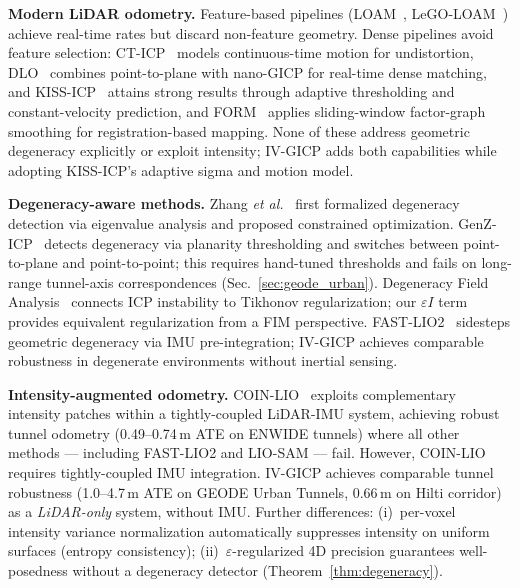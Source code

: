 \documentclass[journal,letterpaper,10pt]{IEEEtran}
\newcommand{\etal}{\textit{et al.}}
\begin{document}
\textbf{Modern LiDAR odometry.}
Feature-based pipelines (LOAM~\cite{zhang2014loam},
LeGO-LOAM~\cite{shan2018lego}) achieve real-time rates but discard
non-feature geometry.
Dense pipelines avoid feature selection:
CT-ICP~\cite{dellenbach2022ct} models continuous-time motion for
undistortion,
DLO~\cite{chen2022dlo} combines point-to-plane with nano-GICP for
real-time dense matching, and
KISS-ICP~\cite{vizzo2023kiss} attains strong results through adaptive
thresholding and constant-velocity prediction,
and FORM~\cite{potokar2025form} applies sliding-window factor-graph
smoothing for registration-based mapping.
None of these address geometric degeneracy explicitly or exploit
intensity; IV-GICP adds both capabilities while
adopting KISS-ICP's adaptive sigma and motion model.

\textbf{Degeneracy-aware methods.}
Zhang \etal~\cite{zhang2016degeneracy} first formalized degeneracy
detection via eigenvalue analysis and proposed constrained optimization.
GenZ-ICP~\cite{zhang2024genz} detects degeneracy via planarity
thresholding and switches between point-to-plane and point-to-point;
this requires hand-tuned thresholds and fails on long-range
tunnel-axis correspondences (Sec.~\ref{sec:geode_urban}).
Degeneracy Field Analysis~\cite{vizzo2024degeneracy} connects ICP
instability to Tikhonov regularization; our $\varepsilon I$ term provides
equivalent regularization from a FIM perspective.
FAST-LIO2~\cite{xu2022fastlio2} sidesteps geometric degeneracy via
IMU pre-integration; IV-GICP achieves comparable robustness in degenerate
environments without inertial sensing.

\textbf{Intensity-augmented odometry.}
COIN-LIO~\cite{pfreundschuh2024coinlio} exploits complementary
intensity patches within a tightly-coupled LiDAR-IMU system,
achieving robust tunnel odometry (0.49--0.74\,m ATE on ENWIDE tunnels)
where all other methods --- including FAST-LIO2 and LIO-SAM --- fail.
However, COIN-LIO requires tightly-coupled IMU integration.
IV-GICP achieves comparable tunnel robustness (1.0--4.7\,m ATE on
GEODE Urban Tunnels, 0.66\,m on Hilti corridor) as a \emph{LiDAR-only}
system, without IMU.
Further differences: (i)~per-voxel intensity variance normalization
automatically suppresses intensity on uniform surfaces (entropy
consistency); (ii)~$\varepsilon$-regularized 4D precision guarantees
well-posedness without a degeneracy detector (Theorem~\ref{thm:degeneracy}).
\end{document}
